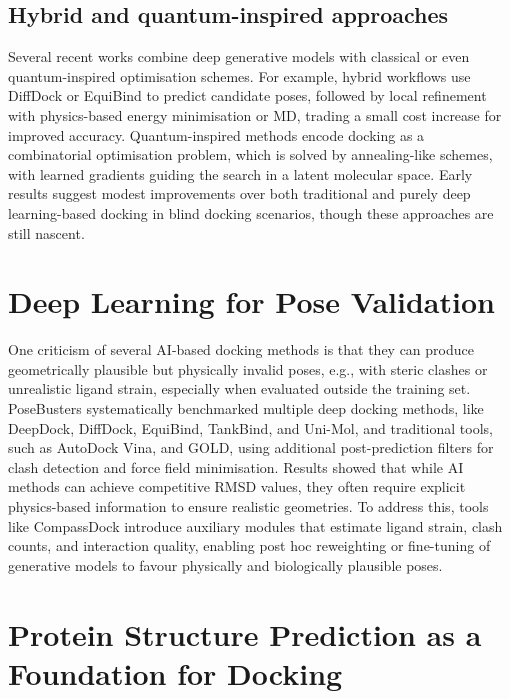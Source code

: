 \documentclass[12pt]{article}
\begin{document}
\subsection{Hybrid and quantum-inspired approaches}

Several recent works combine deep generative models with classical or even quantum-inspired optimisation schemes. For example, hybrid workflows use DiffDock or EquiBind to predict candidate poses, followed by local refinement with physics-based energy minimisation or MD, trading a small cost increase for improved accuracy\cite{CH13_posebusters2023,CH13_compassdock2024}. Quantum-inspired methods encode docking as a combinatorial optimisation problem, which is solved by annealing-like schemes, with learned gradients guiding the search in a latent molecular space\cite{CH13_quantuminspired2024}. Early results suggest modest improvements over both traditional and purely deep learning-based docking in blind docking scenarios, though these approaches are still nascent\cite{CH13_quantuminspired2024}.

\section{Deep Learning for Pose Validation}

One criticism of several AI-based docking methods is that they can produce geometrically plausible but physically invalid poses, e.g., with steric clashes or unrealistic ligand strain, especially when evaluated outside the training set. PoseBusters\cite{CH13_posebusters2023} systematically benchmarked multiple deep docking methods, like DeepDock\cite{CH13_liao2019deepdock}, DiffDock, EquiBind, TankBind\cite{CH13_lu2022tankbind}, and Uni-Mol\cite{CH13_zhou2023uni}, and traditional tools, such as AutoDock Vina, and GOLD, using additional post-prediction filters for clash detection and force field minimisation. Results showed that while AI methods can achieve competitive RMSD values, they often require explicit physics-based information to ensure realistic geometries. To address this, tools like CompassDock\cite{CH13_compassdock2024} introduce auxiliary modules that estimate ligand strain, clash counts, and interaction quality, enabling post hoc reweighting or fine-tuning of generative models to favour physically and biologically plausible poses.


\section{Protein Structure Prediction as a Foundation for Docking}
\end{document}
